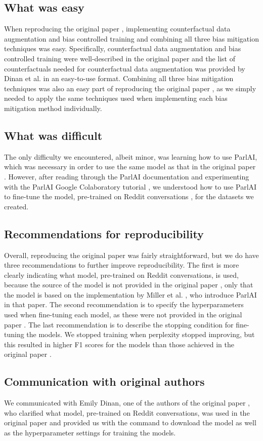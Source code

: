 \subsection{What was easy}
When reproducing the original paper \supercite{dinan2020}, implementing counterfactual data augmentation and bias controlled training and combining all three bias mitigation techniques was easy. Specifically, counterfactual data augmentation and bias controlled training were well-described in the original paper \supercite{dinan2020} and the list of counterfactuals needed for counterfactual data augmentation was provided by Dinan et al. in an easy-to-use format. Combining all three bias mitigation techniques was also an easy part of reproducing the original paper \supercite{dinan2020}, as we simply needed to apply the same techniques used when implementing each bias mitigation method individually.

\subsection{What was difficult}
The only difficulty we encountered, albeit minor, was learning how to use ParlAI, which was necessary in order to use the same model as that in the original paper \supercite{dinan2020}. However, after reading through the ParlAI documentation and experimenting with the ParlAI Google Colaboratory tutorial \supercite{parlai-colab}, we understood how to use ParlAI to fine-tune the model, pre-trained on Reddit conversations \supercite{redditmodel}, for the datasets we created.

\subsection{Recommendations for reproducibility}
Overall, reproducing the original paper \supercite{dinan2020} was fairly straightforward, but we do have three recommendations to further improve reproducibility. The first is more clearly indicating what model, pre-trained on Reddit conversations, is used, because the source of the model is not provided in the original paper \supercite{dinan2020}, only that the model is based on the implementation by Miller et al. \supercite{miller2018}, who introduce ParlAI in that paper. The second recommendation is to specify the hyperparameters used when fine-tuning each model, as these were not provided in the original paper \supercite{dinan2020}. The last recommendation is to describe the stopping condition for fine-tuning the models. We stopped training when perplexity stopped improving, but this resulted in higher F1 scores for the models than those achieved in the original paper \supercite{dinan2020}.

\subsection{Communication with original authors}
We communicated with Emily Dinan, one of the authors of the original paper \supercite{dinan2020}, who clarified what model, pre-trained on Reddit conversations, was used in the original paper \supercite{dinan2020} and provided us with the command to download the model as well as the hyperparameter settings for training the models.
